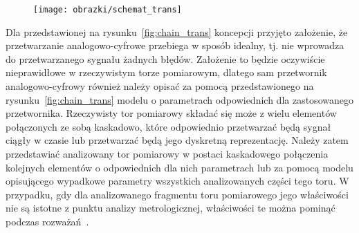 \begin{figure}[htb!]
\begin{center}
\texttt{[image: obrazki/schemat\_trans]}
\end{center}
\end{figure}

Dla przedstawionej na rysunku~\ref{fig:chain_trans} koncepcji przyjęto założenie, że przetwarzanie analogowo-cyfrowe przebiega w sposób idealny, tj. nie wprowadza do przetwarzanego sygnału żadnych błędów. Założenie to będzie oczywiście nieprawidłowe w rzeczywistym torze pomiarowym, dlatego sam przetwornik analogowo-cyfrowy również należy opisać za pomocą przedstawionego na rysunku~\ref{fig:chain_trans} modelu o parametrach odpowiednich dla zastosowanego przetwornika. Rzeczywisty tor pomiarowy składać się może z wielu elementów połączonych ze sobą kaskadowo, które odpowiednio przetwarzać będą sygnał ciągły w czasie lub przetwarzać będą jego dyskretną reprezentację. Należy zatem przedstawiać analizowany tor pomiarowy w postaci kaskadowego połączenia kolejnych elementów o odpowiednich dla nich parametrach lub za pomocą modelu opisującego wypadkowe parametry wszystkich analizowanych części tego toru. W przypadku, gdy dla analizowanego fragmentu toru pomiarowego jego właściwości nie są istotne z punktu analizy metrologicznej, właściwości te można pominąć podczas rozważań~\cite{jcgm_guide}.

